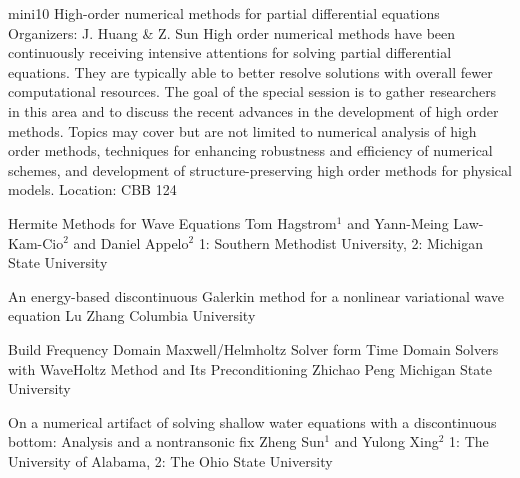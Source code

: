 \mini
{mini10}
{High-order numerical methods for partial differential equations}
{Organizers: J. Huang \& Z. Sun}
{High order numerical methods have been continuously receiving intensive attentions for solving partial differential equations. They are typically able to better resolve solutions with overall fewer computational resources. The goal of the special session is to gather researchers in this area and to discuss the recent advances in the development of high order methods. Topics may cover but are not limited to numerical analysis of high order methods, techniques for enhancing robustness and efficiency of numerical schemes, and development of structure-preserving high order methods for physical models.}
{Location: CBB 124}

\begin{talks}
\item\talk
{Hermite Methods for Wave Equations}
{Tom Hagstrom$^{1}$ and Yann-Meing Law-Kam-Cio$^{2}$ and Daniel Appelo$^{2}$}
{1: Southern Methodist University, 2: Michigan State University}
\item\talk
{An energy-based discontinuous Galerkin method for a nonlinear variational wave equation}
{Lu Zhang}
{Columbia University}
\item\talk
{Build Frequency Domain Maxwell/Helmholtz Solver form Time Domain Solvers with WaveHoltz Method and Its Preconditioning}
{Zhichao Peng}
{Michigan State University}
\item\talk
{On a numerical artifact of solving shallow water equations with a discontinuous bottom: Analysis and a nontransonic fix}
{Zheng Sun$^{1}$ and Yulong Xing$^{2}$}
{1: The University of Alabama, 2: The Ohio State University}
\end{talks}
\room
